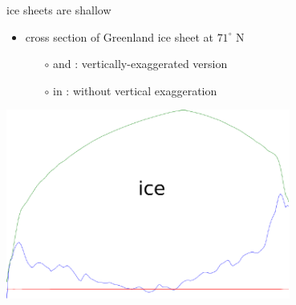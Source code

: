 \documentclass[10pt,hyperref={pdfpagelabels=true}]{beamer}
\begin{document}
\begin{frame}{ice sheets are shallow}

\begin{itemize}
\item cross section of Greenland ice sheet at $71^\circ$ N
  \begin{itemize}
  \item[$\circ$] {\color{dark green}{green}} and {\color{dark blue}{blue}}: vertically-exaggerated version
  \item[$\circ$] in {\color{dark red}{red}}: without vertical exaggeration
  \end{itemize}
\end{itemize}
\normalsize

  \begin{center}
      \quad \includegraphics[width=0.7\textwidth]{greentransecttrimmed}
    
    \bigskip
    \qquad\qquad\qquad {}
  \end{center}
\end{frame}
\end{document}
